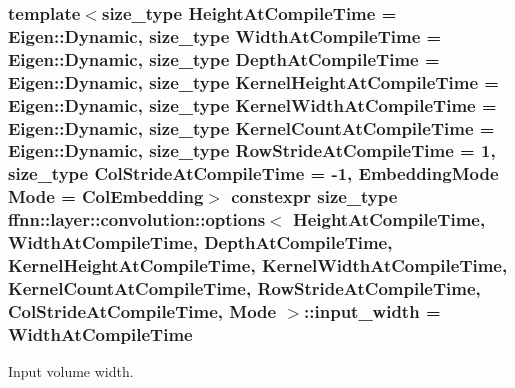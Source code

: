 \hypertarget{structffnn_1_1layer_1_1convolution_1_1options_a17abc9ea9d41cf399fbeae5e3f7580f4}{
\subsubsection[{input\-\_\-width}]{\setlength{\rightskip}{0pt plus 5cm}template$<$size\-\_\-type Height\-At\-Compile\-Time = Eigen\-::\-Dynamic, size\-\_\-type Width\-At\-Compile\-Time = Eigen\-::\-Dynamic, size\-\_\-type Depth\-At\-Compile\-Time = Eigen\-::\-Dynamic, size\-\_\-type Kernel\-Height\-At\-Compile\-Time = Eigen\-::\-Dynamic, size\-\_\-type Kernel\-Width\-At\-Compile\-Time = Eigen\-::\-Dynamic, size\-\_\-type Kernel\-Count\-At\-Compile\-Time = Eigen\-::\-Dynamic, size\-\_\-type Row\-Stride\-At\-Compile\-Time = 1, size\-\_\-type Col\-Stride\-At\-Compile\-Time = -\/1, Embedding\-Mode Mode = Col\-Embedding$>$ constexpr {\bf size\-\_\-type} {\bf ffnn\-::layer\-::convolution\-::options}$<$ Height\-At\-Compile\-Time, Width\-At\-Compile\-Time, Depth\-At\-Compile\-Time, Kernel\-Height\-At\-Compile\-Time, Kernel\-Width\-At\-Compile\-Time, Kernel\-Count\-At\-Compile\-Time, Row\-Stride\-At\-Compile\-Time, Col\-Stride\-At\-Compile\-Time, Mode $>$\-::input\-\_\-width = Width\-At\-Compile\-Time\hspace{0.3cm}{\ttfamily [static]}}}\label{structffnn_1_1layer_1_1convolution_1_1options_a17abc9ea9d41cf399fbeae5e3f7580f4}


Input volume width. 


